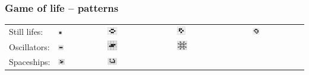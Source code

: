 \documentclass{beamer}
\newcommand{\heading}[1]{\frametitle{#1}}
\begin{document}
\begin{frame}[fragile]
 \heading{Game of life -- patterns}
 
\begin{tabular}{lllll}
 Still lifes: \vspace{2ex} & \includegraphics[draft=false,width=0.1\textwidth]
{66px-Game_of_life_block_with_border.png} & 
\includegraphics[draft=false,width=0.148485\textwidth]
{98px-Game_of_life_beehive.png} &
\includegraphics[draft=false,width=0.12424\textwidth]
{82px-Game_of_life_boat.png} &
\includegraphics[draft=false,width=0.148485\textwidth]
{98px-Game_of_life_loaf.png} \\
 Oscillators:\vspace{2ex}  & 
\includegraphics[draft=false,width=0.12424\textwidth]{blinker_0.png} &
\includegraphics[draft=false,width=0.148485\textwidth]{toad_0.png} &
\includegraphics[draft=false,width=0.148485\textwidth]{pulsar_0.png} 
& 
\\
Spaceships: &
\includegraphics[draft=false,width=0.148485\textwidth]{glider_13.png} &
\includegraphics[draft=false,width=0.148485\textwidth]{lwss_0.png} &
&
\end{tabular}


\end{frame}
\end{document}
